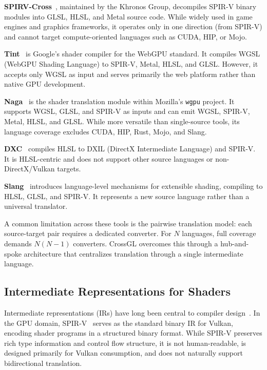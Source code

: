 \documentclass{svproc}
\begin{document}
\textbf{SPIRV-Cross}~\cite{khronos2023spirvcross}, maintained by the Khronos Group, decompiles SPIR-V binary modules into GLSL, HLSL, and Metal source code. While widely used in game engines and graphics frameworks, it operates only in one direction (from SPIR-V) and cannot target compute-oriented languages such as CUDA, HIP, or Mojo.

\textbf{Tint}~\cite{google2023tint} is Google's shader compiler for the WebGPU standard. It compiles WGSL (WebGPU Shading Language) to SPIR-V, Metal, HLSL, and GLSL. However, it accepts only WGSL as input and serves primarily the web platform rather than native GPU development.

\textbf{Naga}~\cite{mozilla2023naga} is the shader translation module within Mozilla's \texttt{wgpu} project. It supports WGSL, GLSL, and SPIR-V as inputs and can emit WGSL, SPIR-V, Metal, HLSL, and GLSL. While more versatile than single-source tools, its language coverage excludes CUDA, HIP, Rust, Mojo, and Slang.

\textbf{DXC}~\cite{microsoft2023dxc} compiles HLSL to DXIL (DirectX Intermediate Language) and SPIR-V. It is HLSL-centric and does not support other source languages or non-DirectX/Vulkan targets.

\textbf{Slang}~\cite{he2018slang} introduces language-level mechanisms for extensible shading, compiling to HLSL, GLSL, and SPIR-V. It represents a new source language rather than a universal translator.

A common limitation across these tools is the pairwise translation model: each source-target pair requires a dedicated converter. For $N$ languages, full coverage demands $N(N-1)$ converters. CrossGL overcomes this through a hub-and-spoke architecture that centralizes translation through a single intermediate language.

\subsection{Intermediate Representations for Shaders}

Intermediate representations (IRs) have long been central to compiler design~\cite{aho2006compilers}. In the GPU domain, SPIR-V~\cite{khronos2022spirv} serves as the standard binary IR for Vulkan, encoding shader programs in a structured binary format. While SPIR-V preserves rich type information and control flow structure, it is not human-readable, is designed primarily for Vulkan consumption, and does not naturally support bidirectional translation.
\end{document}
